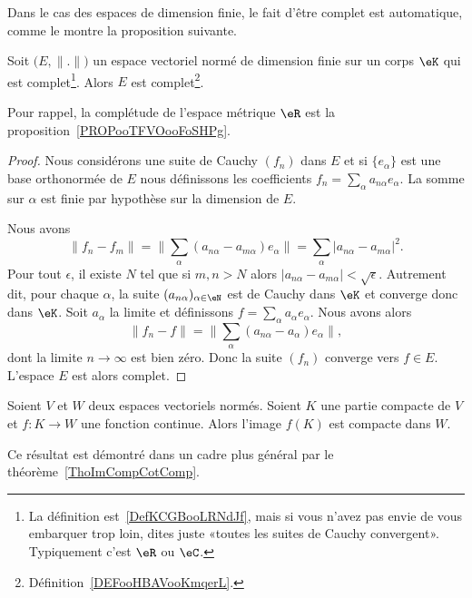Dans le cas des espaces de dimension finie, le fait d'être complet est automatique, comme le montre la proposition suivante.
\begin{proposition}     \label{PROPooGJDTooXOoYfw}
    Soit \( \big( E,\| . \| \big)\) un espace vectoriel normé de dimension finie sur un corps \( \eK\) qui est complet\footnote{La définition est~\ref{DefKCGBooLRNdJf}, mais si vous n'avez pas envie de vous embarquer trop loin, dites juste «toutes les suites de Cauchy convergent». Typiquement c'est \( \eR\) ou \( \eC\).}. Alors \( E\) est complet\footnote{Définition~\ref{DEFooHBAVooKmqerL}.}.
\end{proposition}
Pour rappel, la complétude de l'espace métrique \( \eR\) est la proposition~\ref{PROPooTFVOooFoSHPg}.

\begin{proof}
    Nous considérons une suite de Cauchy \( (f_n)\) dans \( E\) et si \( \{ e_{\alpha} \} \) est une base orthonormée de \( E\) nous définissons les coefficients \( f_n=\sum_{\alpha}a_{n\alpha}e_{\alpha} \). La somme sur \( \alpha\) est finie par hypothèse sur la dimension de \( E\).

    Nous avons
    \begin{equation}
        \| f_n-f_m \|=\| \sum_{\alpha}(a_{n\alpha}-a_{m\alpha})e_{\alpha} \|=\sum_{\alpha}| a_{n\alpha}-a_{m\alpha} |^2.
    \end{equation}
    Pour tout \( \epsilon\), il existe \( N\) tel que si \( m,n>N\) alors \( | a_{n\alpha}-a_{m\alpha} |<\sqrt{ \epsilon }\). Autrement dit, pour chaque \( \alpha\), la suite \( (a_{n\alpha})_{\alpha\in \eN}\) est de Cauchy dans \( \eK\) et converge donc dans \( \eK\). Soit \( a_{\alpha}\) la limite et définissons \( f=\sum_{\alpha}a_{\alpha}e_{\alpha}\). Nous avons alors
    \begin{equation}
        \| f_n-f \|=\| \sum_{\alpha}(a_{n\alpha}-a_{\alpha})e_{\alpha} \|,
    \end{equation}
    dont la limite \( n\to \infty\) est bien zéro. Donc la suite \( (f_n)\) converge vers \( f\in E\). L'espace \( E\) est alors complet.
\end{proof}




\begin{proposition}		\label{PropContinueCompactBorne}
	Soient $V$ et $W$ deux espaces vectoriels normés. Soient $K$ une partie compacte de $V$ et $f\colon K\to W$ une fonction continue. Alors l'image $f(K)$ est compacte dans $W$.
\end{proposition}
Ce résultat est démontré dans un cadre plus général par le théorème~\ref{ThoImCompCotComp}.

